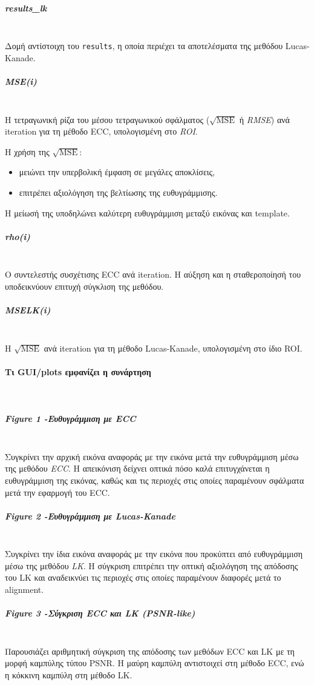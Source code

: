 \documentclass[12pt]{article}
\begin{document}
\subparagraph{\textbf{results\_lk}}
\mbox{}\\
Δομή αντίστοιχη του \texttt{results}, η οποία περιέχει τα αποτελέσματα της μεθόδου Lucas-Kanade.

\subparagraph{\textbf{MSE(i)}}
\mbox{}\\
Η τετραγωνική ρίζα του μέσου τετραγωνικού σφάλματος (\(\sqrt{\text{MSE}}\) ή \textit{RMSE}) ανά iteration για τη μέθοδο ECC, υπολογισμένη στο \textit{ROI}.

Η χρήση της \(\sqrt{\text{MSE}}\):
\begin{itemize}
    \item μειώνει την υπερβολική έμφαση σε μεγάλες αποκλίσεις,
    \item επιτρέπει αξιολόγηση της βελτίωσης της ευθυγράμμισης.
\end{itemize}
Η μείωσή της υποδηλώνει καλύτερη ευθυγράμμιση μεταξύ εικόνας και template.

\subparagraph{\textbf{rho(i)}}
\mbox{}\\
Ο συντελεστής συσχέτισης ECC ανά iteration. Η αύξηση και η σταθεροποίησή του υποδεικνύουν επιτυχή σύγκλιση της μεθόδου.

\subparagraph{\textbf{MSELK(i)}}
\mbox{}\\
Η \(\sqrt{\text{MSE}}\) ανά iteration για τη μέθοδο Lucas-Kanade, υπολογισμένη στο ίδιο ROI. 



\paragraph{Τι GUI/plots εμφανίζει η συνάρτηση}
\mbox{}\\
\subparagraph{Figure 1 -Ευθυγράμμιση με ECC}
\mbox{}\\
Συγκρίνει την αρχική εικόνα αναφοράς με την εικόνα μετά την ευθυγράμμιση μέσω της μεθόδου \textit{ECC}. Η απεικόνιση δείχνει οπτικά πόσο καλά επιτυγχάνεται η ευθυγράμμιση της εικόνας, καθώς και τις περιοχές στις οποίες παραμένουν σφάλματα μετά την εφαρμογή του ECC.

\subparagraph{Figure 2 -Ευθυγράμμιση με Lucas-Kanade}
\mbox{}\\
Συγκρίνει την ίδια εικόνα αναφοράς με την εικόνα που προκύπτει από ευθυγράμμιση μέσω της μεθόδου \textit{LK}. Η σύγκριση επιτρέπει την οπτική αξιολόγηση της απόδοσης του LK και αναδεικνύει τις περιοχές στις οποίες παραμένουν διαφορές μετά το alignment.

\subparagraph{Figure 3 -Σύγκριση ECC και LK (PSNR-like)}
\mbox{}\\
Παρουσιάζει αριθμητική σύγκριση της απόδοσης των μεθόδων ECC και LK με τη μορφή καμπύλης τύπου PSNR. Η μαύρη καμπύλη αντιστοιχεί στη μέθοδο ECC, ενώ η κόκκινη καμπύλη στη μέθοδο LK.
\end{document}
